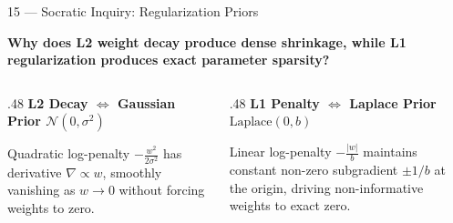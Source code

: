\documentclass[aspectratio=169,10pt]{beamer}
\begin{document}
\begin{frame}{15 — Socratic Inquiry: Regularization Priors}
  \vfill
  \begin{center}
    {\fontsize{14}{18}\selectfont\bfseries\color{BayesInk}Why does L2 weight decay produce dense shrinkage, while L1 regularization produces exact parameter sparsity?}
  \end{center}
  \vspace{.25cm}
  \begin{columns}[T,onlytextwidth]
    \begin{column}{.48\textwidth}
      {\small\bfseries\color{BayesBlue}L2 Decay $\Longleftrightarrow$ Gaussian Prior $\mathcal{N}(0, \sigma^2)$}\par\vspace{.06cm}
      {\small Quadratic log-penalty $-\frac{w^2}{2\sigma^2}$ has derivative $\nabla \propto w$, smoothly vanishing as $w \to 0$ without forcing weights to zero.}
    \end{column}
    \hfill
    \begin{column}{.48\textwidth}
      {\small\bfseries\color{BayesCrimson}L1 Penalty $\Longleftrightarrow$ Laplace Prior $\text{Laplace}(0, b)$}\par\vspace{.06cm}
      {\small Linear log-penalty $-\frac{|w|}{b}$ maintains constant non-zero subgradient $\pm 1/b$ at the origin, driving non-informative weights to exact zero.}
    \end{column}
  \end{columns}
  \vfill
\end{frame}
\end{document}
